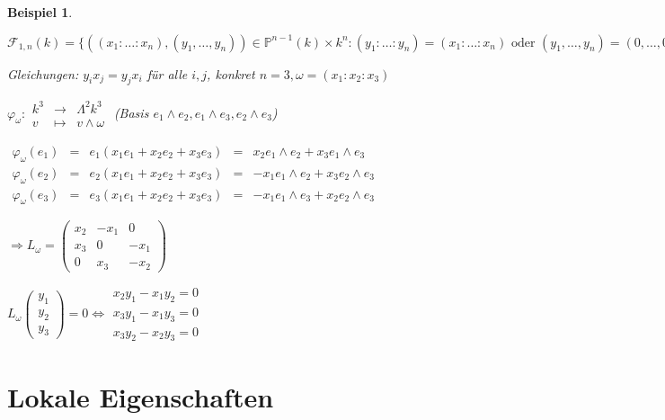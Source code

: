 \documentclass[a4paper, 12pt, numbers=noendperiod, chapterprefix=true, headsepline]{scrbook}
\theoremstyle{break}
\theoremstyle{nonumberbreak}
\newtheorem{nnBsp}{Beispiel}
\theoremstyle{nonumberplain}
\newcommand{\IP}{\mathbb{P}}%
\newcommand{\calF}{\mathcal{F}}
\begin{document}
\begin{nnBsp}\begin{description}[\setlabelstyle{\normalfont}]\item[$d = 1$:]
$\calF_{1,n}(k)=\{((x_1:\ldots :x_n),(y_1,\ldots ,y_n))\in\IP^{n-1}(k)\times k^n : (y_1:\ldots :y_n)=(x_1:\ldots :x_n) \text{ oder } (y_1,\ldots ,y_n)=(0,\ldots ,0)\}$

Gleichungen: $y_ix_j=y_jx_i$ f\"ur alle $i,j$, konkret $n=3, \omega=(x_1:x_2:x_3)$

$\varphi_\omega:\begin{array}{rcl} k^3&\to&\Lambda^2k^3\\v&\mapsto&v\wedge\omega\end{array}$ (Basis $e_1\wedge e_2, e_1\wedge e_3, e_2\wedge e_3$)

$\begin{array}{rclcr}
\varphi_\omega(e_1) &=& e_1 (x_1e_1+x_2e_2+x_3e_3) &=& x_2e_1\wedge e_2 + x_3e_1\wedge e_3\\
\varphi_\omega(e_2) &=& e_2 (x_1e_1+x_2e_2+x_3e_3) &=& -x_1e_1\wedge e_2 + x_3e_2\wedge e_3\\
\varphi_\omega(e_3) &=& e_3 (x_1e_1+x_2e_2+x_3e_3) &=&-x_1e_1\wedge e_3 + x_2e_2\wedge e_3\end{array}$

$\Rightarrow L_\omega = \begin{pmatrix}x_2&-x_1&0\\x_3&0&-x_1\\0&x_3&-x_2\end{pmatrix}$

$L_\omega\begin{pmatrix}y_1\\y_2\\y_3\end{pmatrix}=0 \Leftrightarrow \begin{matrix}x_2y_1-x_1y_2=0\\x_3y_1-x_1y_3=0\\x_3y_2-x_2y_3=0\end{matrix}$
\end{description}\end{nnBsp}

\newpage


\chapter{Lokale Eigenschaften}
\setcounter{section}{14}
\end{document}

